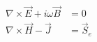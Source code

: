 \begin{equation}
\begin{split}
\nabla \times \vec{E} + i\omega\vec{B} &= 0 \\
\nabla \times \vec{H} - \vec{J} &= \vec{S}_e
\end{split}
\label{eq:MaxwellFreq}
\end{equation}
